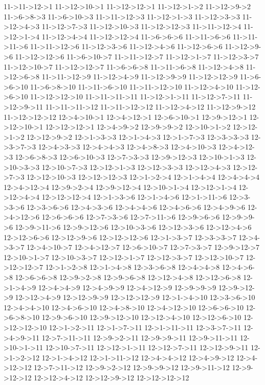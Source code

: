 \begin{framed}
{11->11->12->1 11->12->10->1 11->12->12->1 11->12->1->2 11->12->9->2 11->6->8->3 11->6->10->3 11->11->12->3 11->12->1->3 11->12->3->3 11->12->4->3 11->12->7->3 11->12->10->3 11->12->12->3 11->11->12->4 11->12->1->4 11->12->4->4 11->12->12->4 11->6->6->6 11->11->6->6 11->11->11->6 11->11->12->6 11->12->3->6 11->12->4->6 11->12->6->6 11->12->9->6 11->12->12->6 11->6->10->7 11->11->12->7 11->12->1->7 11->12->3->7 11->12->10->7 11->12->12->7 11->6->6->8 11->11->6->8 11->12->4->8 11->12->6->8 11->11->12->9 11->12->4->9 11->12->9->9 11->12->12->9 11->6->6->10 11->6->8->10 11->11->6->10 11->11->12->10 11->12->4->10 11->12->6->10 11->12->12->10 11->11->11->11 11->12->1->11 11->12->7->11 11->12->9->11 11->11->11->12 11->11->12->12 11->12->4->12 11->12->9->12 11->12->12->12 12->4->10->1 12->4->12->1 12->6->10->1 12->9->12->1 12->12->10->1 12->12->12->1 12->4->9->2 12->9->9->2 12->10->1->2 12->12->1->2 12->12->9->2 12->1->3->3 12->1->4->3 12->1->7->3 12->3->3->3 12->3->7->3 12->4->3->3 12->4->4->3 12->4->8->3 12->4->10->3 12->4->12->3 12->6->8->3 12->6->10->3 12->7->3->3 12->9->12->3 12->10->1->3 12->10->3->3 12->10->7->3 12->12->1->3 12->12->3->3 12->12->4->3 12->12->7->3 12->12->10->3 12->12->12->3 12->1->2->4 12->1->4->4 12->4->4->4 12->4->12->4 12->9->2->4 12->9->12->4 12->10->1->4 12->12->1->4 12->12->4->4 12->12->12->4 12->1->3->6 12->1->4->6 12->1->11->6 12->3->3->6 12->3->6->6 12->4->3->6 12->4->4->6 12->4->6->6 12->4->9->6 12->4->12->6 12->6->6->6 12->7->3->6 12->7->11->6 12->9->6->6 12->9->9->6 12->9->11->6 12->9->12->6 12->10->3->6 12->12->3->6 12->12->4->6 12->12->6->6 12->12->9->6 12->12->12->6 12->1->3->7 12->3->3->7 12->4->3->7 12->4->10->7 12->4->12->7 12->6->10->7 12->7->3->7 12->9->12->7 12->10->1->7 12->10->3->7 12->12->1->7 12->12->3->7 12->12->10->7 12->12->12->7 12->1->2->8 12->1->4->8 12->3->6->8 12->4->4->8 12->4->6->8 12->6->6->8 12->9->2->8 12->9->6->8 12->12->4->8 12->12->6->8 12->1->4->9 12->4->4->9 12->4->9->9 12->4->12->9 12->9->9->9 12->9->12->9 12->12->4->9 12->12->9->9 12->12->12->9 12->1->4->10 12->3->6->10 12->4->4->10 12->4->6->10 12->4->8->10 12->4->12->10 12->6->6->10 12->6->8->10 12->9->6->10 12->9->12->10 12->12->4->10 12->12->6->10 12->12->12->10 12->1->2->11 12->1->7->11 12->1->11->11 12->3->7->11 12->4->9->11 12->7->11->11 12->9->2->11 12->9->9->11 12->9->11->11 12->10->1->11 12->10->7->11 12->12->1->11 12->12->7->11 12->12->9->11 12->1->2->12 12->1->4->12 12->1->11->12 12->4->4->12 12->4->9->12 12->4->12->12 12->7->11->12 12->9->2->12 12->9->9->12 12->9->11->12 12->9->12->12 12->12->4->12 12->12->9->12 12->12->12->12
  }
  \vspace*{0pt}
\end{framed}

